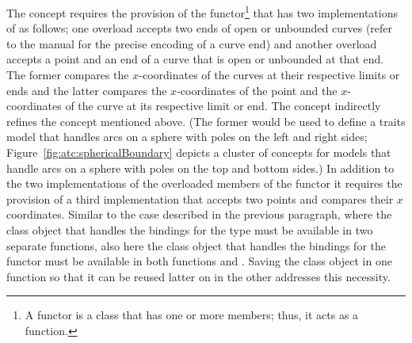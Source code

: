 The concept  requires the
provision of the 
functor\footnote{A functor is a class that has one or more
   members; thus, it acts as a function.}
that has two implementations of  as follows;
one overload accepts two ends of open or unbounded curves (refer to
the manual for the precise encoding of a curve end) and another
overload accepts a point and an end of a curve that is open or
unbounded at that end. The former compares the $x$-coordinates of the
curves at their respective limits or ends and the latter compares the
$x$-coordinates of the point and the $x$-coordinates of the curve at
its respective limit or end.
%
The concept  indirectly
refines the concept 
mentioned above. (The former would be used to define a traits model
that handles arcs on a sphere with poles on the left and right sides;
Figure~\ref{fig:atc:sphericalBoundary} depicts a cluster of concepts
for models that handle arcs on a sphere with poles on the top and
bottom sides.) In addition to the two implementations of the
overloaded members  of the functor
 it requires the provision
of a third implementation that accepts two points and compares their
$x$ coordinates. Similar to the case described in the previous
paragraph, where the class object that handles the bindings for the
 type must be available in two separate
functions, also here the class object that handles the bindings for
the functor  must be
available in both functions
 and
. Saving the
class object in one function so that it can be reused latter on in the
other addresses this necessity.

